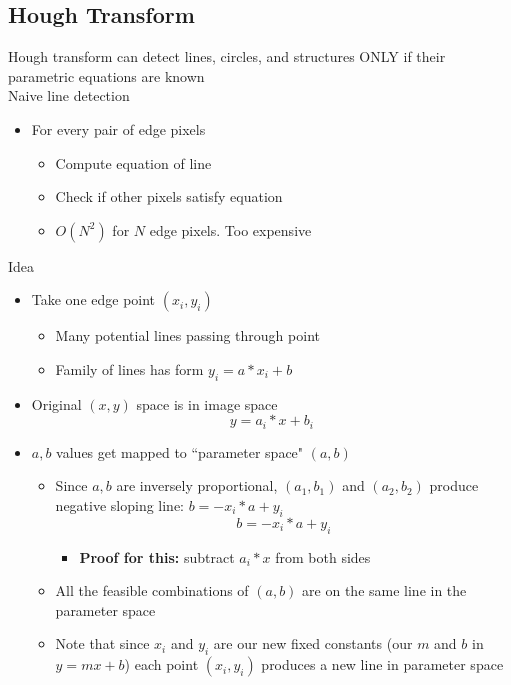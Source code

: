 \subsection{Hough Transform}
Hough transform can detect lines, circles, and structures ONLY if their parametric equations are known\vspace{0.15in}\\
Naive line detection
\begin{itemize}
    \item For every pair of edge pixels
    \begin{itemize}
        \item Compute equation of line
        \item Check if other pixels satisfy equation
        \item $O(N^2)$ for $N$ edge pixels. Too expensive
    \end{itemize}
\end{itemize}
Idea
\begin{itemize}
    \item Take one edge point $(x_i,y_i)$
    \begin{itemize}
        \item Many potential lines passing through point
        \item Family of lines has form $y_i = a*x_i +b$
    \end{itemize}
    \item Original $(x,y)$ space is in image space
    \[y=a_i*x+b_i\]
    \item $a,b$ values get mapped to ``parameter space" $(a,b)$
    \begin{itemize}
        \item Since $a,b$ are inversely proportional, $(a_1,b_1)$ and $(a_2,b_2)$ produce negative sloping line: $b=-x_i * a + y_i$
        \[b=-x_i*a+y_i\]
        \begin{itemize}
            \item \textbf{Proof for this:} subtract $a_i * x$ from both sides
        \end{itemize}
        \item All the feasible combinations of $(a,b)$ are on the same line in the parameter space
        \item Note that since $x_i$ and $y_i$ are our new fixed constants (our $m$ and $b$ in $y=mx+b$) each point $(x_i,y_i)$ produces a new line in parameter space
    \end{itemize}
\end{itemize}
